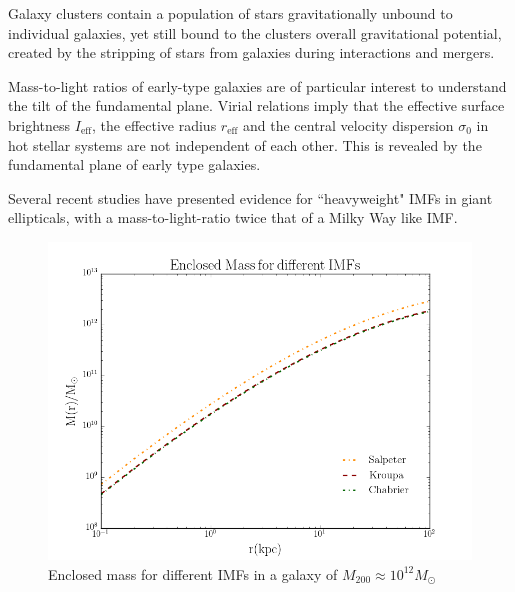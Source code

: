 Galaxy clusters contain a population of stars gravitationally unbound to individual galaxies, yet still bound to the clusters overall gravitational potential, created by the stripping of stars from galaxies during interactions and mergers.

Mass-to-light ratios of early-type galaxies are of particular interest to understand the tilt of the fundamental plane. Virial relations imply that the effective surface brightness $I_{\text{eff}}$, the effective radius $r_{\text{eff}}$ and the central velocity dispersion $\sigma_{0}$ in hot stellar systems are not independent of each other. This is revealed by the fundamental plane of early type galaxies.

Several recent studies have presented evidence for ``heavyweight" IMFs in giant ellipticals, with a mass-to-light-ratio twice that of a Milky Way like IMF.    
   
\begin{figure}[H]
\centering
\includegraphics[width=12cm]{images/Enclosed_Mass_IMFs.png}
\caption[Enclosed mass for different IMFs in a galaxy]{Enclosed mass for different IMFs in a galaxy of $M_{200}\approx 10^{12} M_{\odot}$}
\end{figure}   